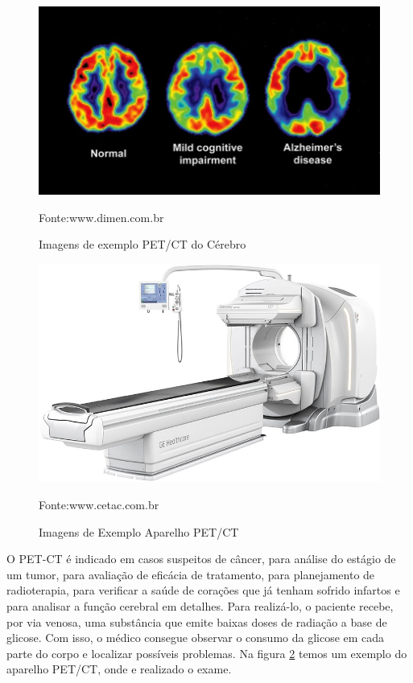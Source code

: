 \documentclass[openright]{UFRGS} %
\begin{document}
\begin{figure}[h]
    \centering
    \caption{Imagens de exemplo PET/CT do Cérebro}
    \includegraphics[scale=0.35]{figuras/alzheimersprogressionpet_1227001-860x475.jpg}
    \centerline{Fonte:www.dimen.com.br}
    \label{fig:petct}
\end{figure}

\begin{figure}[h]
    \centering
    \caption{Imagens de Exemplo Aparelho PET/CT}
    \includegraphics[scale=0.35]{figuras/discovery630-medicina-nuclear.jpg}
    \centerline{Fonte:www.cetac.com.br}
    \label{fig:petctapa}
\end{figure}

O PET-CT é indicado em casos suspeitos de câncer, para análise do estágio de um tumor, para avaliação de eficácia de tratamento, para planejamento de radioterapia, para verificar a saúde de corações que já tenham sofrido infartos e para analisar a função cerebral em detalhes.
Para realizá-lo, o paciente recebe, por via venosa, uma substância que emite baixas doses de radiação a base de glicose. Com isso, o médico consegue observar o consumo da glicose em cada parte do corpo e localizar possíveis problemas. Na figura
\ref{fig:petctapa} temos um exemplo do aparelho PET/CT, onde e realizado o exame.
\end{document}
